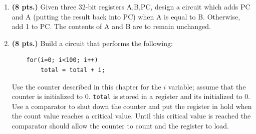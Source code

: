 \begin{enumerate}
\begin{solution} {
\begin{figure}[ht]
\end{figure}
} \end{solution}

\item {\bf (8 pts.)} Given three 32-bit registers A,B,PC, design a circuit
which adds PC and A (putting the result back into PC) when A is equal
to B.  Otherwise, add 1 to PC.  The contents of A and B
are to remain unchanged.

\begin{solution} {
\begin{figure}[ht]
\end{figure}
} \end{solution}

\item {\bf (8 pts.)} Build a circuit that performs the following: 
\begin{verbatim}
    for(i=0; i<100; i++) 
        total = total + i;
\end{verbatim}
Use the counter described in this chapter for the $i$ variable; 
assume that the counter is initialized to 0. \verb^total^ is stored 
in a register and its initialized to 0.  Use a comparator to shut 
down the counter and put the register in hold when the count value 
reaches a critical value. Until this critical value is 
reached the comparator should allow the counter to count and the 
register to load.  


\end{enumerate}
